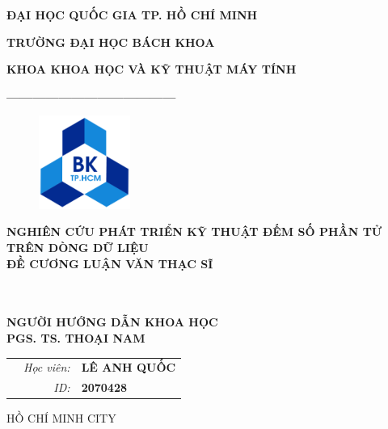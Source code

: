 \documentclass[letterpaper,13pt]{article}
\theoremstyle{mytheor}
\begin{document}
\begin{titlepage}
\begin{center} {\textbf{ĐẠI HỌC QUỐC GIA TP. HỒ CHÍ MINH}
}

{\textbf{TRƯỜNG ĐẠI HỌC BÁCH KHOA}
}

{\textbf{KHOA KHOA HỌC VÀ KỸ THUẬT MÁY TÍNH }
}

{\textbf{---------------------------------------}}

\end{center}

\vspace{1cm}

\begin{figure}[h!]
\begin{center}
\includegraphics[width=3cm]{hcmut.png}
\end{center}
\end{figure}

\vspace{2cm}


\begin{center}
\textbf{\Large NGHIÊN CỨU PHÁT TRIỂN KỸ THUẬT ĐẾM SỐ PHẦN TỬ \\TRÊN DÒNG DỮ LIỆU}
\vspace{2cm}
\\
\textbf{\Large ĐỀ CƯƠNG LUẬN VĂN THẠC SĨ}

\vspace{0.5cm}

\vspace{0.5cm}
\\
\vspace{1cm}
\\
\textbf{\small NGƯỜI HƯỚNG DẪN KHOA HỌC }
~~\\
\textbf{\small PGS. TS. THOẠI NAM}


\end{center}

\vspace{1cm}

\begin{table}[h]
\begin{tabular}{rrl}
\hspace{5.6cm} 
&\textit{Học viên: } & \textbf{LÊ ANH QUỐC}\\
&\textit{ID: } & \textbf{2070428}\\

\end{tabular}
\end{table}
\vspace{1cm}
\begin{center}
{\footnotesize HỒ CHÍ MINH CITY}
\end{center}
\end{titlepage}
\end{document}
